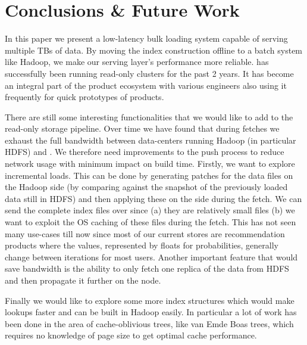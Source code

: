 \section{Conclusions \& Future Work}
\label{sec:conclusion}

In this paper we present a low-latency bulk loading system capable of serving multiple TBs of data. By moving the index construction offline to a batch system like Hadoop, we make our serving layer's performance more reliable. \linkedin{} has successfully been running read-only \projectname{} clusters for the past 2 years. It has become an integral part of the product ecosystem with various engineers also using it frequently for quick prototypes of products. 

There are still some interesting functionalities that we would like to add to the read-only storage pipeline. Over time we have found that during fetches we exhaust the full bandwidth between data-centers running Hadoop (in particular HDFS) and \projectname{}. We therefore need improvements to the push process to reduce network usage with minimum impact on build time. Firstly, we want to explore incremental loads. This can be done by generating patches for the data files on the Hadoop side (by comparing against the snapshot of the previously loaded data still in HDFS) and then applying these on the \projectname{} side during the fetch. We can send the complete index files over since (a) they are relatively small files (b) we want to exploit the OS caching of these files during the fetch. This has not seen many use-cases till now since most of our current stores are recommendation products where the values, represented by floats for probabilities, generally change between iterations for most users. Another important feature that would save bandwidth is the ability to only fetch one replica of the data from HDFS and then propagate it further on the \projectname{} node. 

Finally we would like to explore some more index structures which would make lookups faster and can be built in Hadoop easily. In particular a lot of work has been done in the area of cache-oblivious trees, like van Emde Boas trees, which requires no knowledge of page size to get optimal cache performance. 

